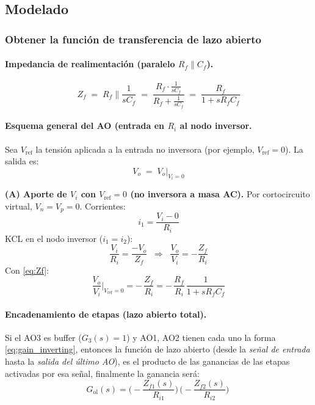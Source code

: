 \subsection{Modelado}
\subsubsection{Obtener la función de transferencia de lazo abierto}

\paragraph{Impedancia de realimentación (paralelo $R_f \parallel C_f$).}



\begin{equation}
	Z_f \;=\; R_f \parallel \frac{1}{sC_f}
	\;=\; \frac{R_f\cdot \frac{1}{sC_f}}{R_f + \frac{1}{sC_f}}
	\;=\; \frac{R_f}{1 + s R_f C_f}
	\label{eq:Zf}
\end{equation}


\paragraph{Esquema general del AO (entrada en $R_i$ al nodo inversor.}
Sea $V_{\text{ref}}$ la tensión aplicada a la entrada no inversora (por ejemplo, $V_{\text{ref}}=0$). La salida es:
\[
V_o \;=\;  V_o\big|_{V_i=0}
\]

\textbf{(A) Aporte de $V_i$ con $V_{\text{ref}}=0$ (no inversora a masa AC).}
Por cortocircuito virtual, $V_n=V_p=0$. Corrientes:
\[
i_1=\frac{V_i-0}{R_i}
\]
KCL en el nodo inversor ($i_1=i_2$):
\[
\frac{V_i}{R_i}=\frac{-V_o}{Z_f}
\;\;\Rightarrow\;\;
\frac{V_o}{V_i}=-\frac{Z_f}{R_i}
\]
Con \eqref{eq:Zf}:
\begin{equation}
	\frac{V_o}{V_i}\Bigg|_{V_{\text{ref}}=0}
	= -\,\frac{Z_f}{R_i}
	= -\,\frac{R_f}{R_i}\,\frac{1}{1+sR_f C_f}
	\label{eq:gain_inverting}
\end{equation}


\paragraph{Encadenamiento de etapas (lazo abierto total).}
Si el AO3 es buffer ($G_3(s)=1$) y AO1, AO2 tienen cada uno la forma \eqref{eq:gain_inverting}, entonces la función de lazo abierto (desde la \emph{señal de entrada} hasta la \emph{salida del último AO}), es el producto de las ganancias de las etapas activadas por esa señal, finalmente la ganancia será:
\[
G_{\text{ol}}(s)
= \Big(-\frac{Z_{f1}(s)}{R_{i1}}\Big)\,
\Big(-\frac{Z_{f2}(s)}{R_{i2}}\Big)\
\]

